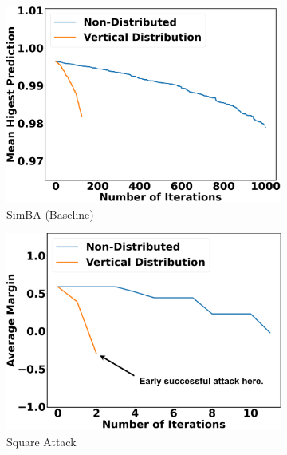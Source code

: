 \begin{figure}[bph]
\centering
\begin{subfigure}[b]{0.32\textwidth}
    \centering
    \includegraphics[width=\textwidth]{figures/chapter_classification/simba_attack_vertical_margin.png}
    \caption{SimBA (Baseline)}
    \label{fig:simba_plot}
\end{subfigure}
\hfill
\begin{subfigure}[b]{0.32\textwidth}
    \centering
    \includegraphics[width=\textwidth]{figures/chapter_classification/square_attack_vertical_margin.png}
    \caption{Square Attack}
    \label{fig:square_plot}
\end{subfigure}
\hfill
\begin{subfigure}[b]{0.32\textwidth}
    \centering

\end{subfigure}
\end{figure}
